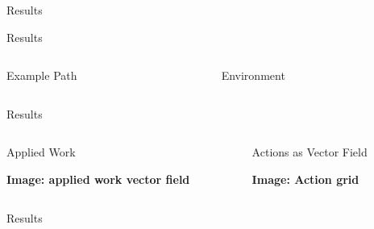 \documentclass[xcolor=table, 9pt]{beamer}
\begin{document}
\begin{section}{Results}
\begin{frame}{Results}
    \begin{columns}
        \begin{column}{0.5\textwidth}
            \begin{block}{Example Path}
                \begin{center}
                \end{center}
            \end{block}
        \end{column}
        \begin{column}{0.5\textwidth}
            \begin{block}{Environment}
                \begin{center}
                \end{center}
            \end{block}
        \end{column}
    \end{columns}
\end{frame}
\begin{frame}{Results}
    \begin{columns}
        \begin{column}{0.5\textwidth}
            \begin{block}{Applied Work}
                \begin{center}
                    \textbf{Image: applied work vector field}
                \end{center}
            \end{block}
        \end{column}
        \begin{column}{0.5\textwidth}
            \begin{block}{Actions as Vector Field}
                \begin{center}
                    \textbf{Image: Action grid}
                \end{center}
            \end{block}
        \end{column}
    \end{columns}
\end{frame}
\begin{frame}{Results}

\end{frame}
\end{section}
\end{document}
